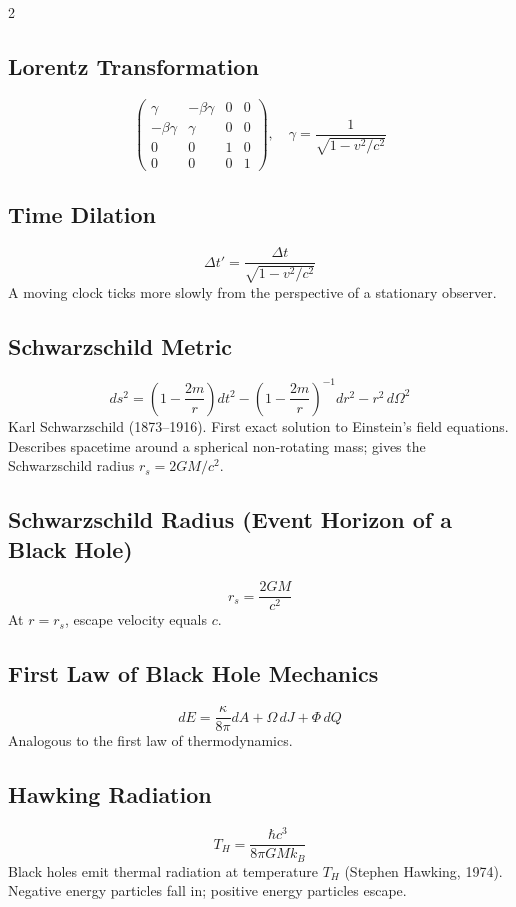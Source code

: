 \documentclass[10pt,a4paper]{article}
\begin{document}
\begin{multicols}{2}
\subsection{Lorentz Transformation}
\[
\begin{pmatrix}\gamma & -\beta\gamma & 0 & 0\\-\beta\gamma & \gamma & 0 & 0\\0 & 0 & 1 & 0\\0 & 0 & 0 & 1\end{pmatrix}, \quad \gamma = \frac{1}{\sqrt{1-v^2/c^2}}
\]

\subsection{Time Dilation}
\[
\Delta t' = \frac{\Delta t}{\sqrt{1-v^2/c^2}}
\]
A moving clock ticks more slowly from the perspective of a stationary observer.

\subsection{Schwarzschild Metric}
\[
ds^2 = \left(1-\frac{2m}{r}\right)dt^2 - \left(1-\frac{2m}{r}\right)^{-1}dr^2 - r^2\,d\Omega^2
\]
Karl Schwarzschild (1873--1916). First exact solution to Einstein's field equations. Describes spacetime around a spherical non-rotating mass; gives the Schwarzschild radius $r_s = 2GM/c^2$.

\subsection{Schwarzschild Radius (Event Horizon of a Black Hole)}
\[
r_s = \frac{2GM}{c^2}
\]
At $r = r_s$, escape velocity equals $c$.

\subsection{First Law of Black Hole Mechanics}
\[
dE = \frac{\kappa}{8\pi}dA + \Omega\,dJ + \Phi\,dQ
\]
Analogous to the first law of thermodynamics.

\subsection{Hawking Radiation}
\[
T_H = \frac{\hbar c^3}{8\pi G M k_B}
\]
Black holes emit thermal radiation at temperature $T_H$ (Stephen Hawking, 1974). Negative energy particles fall in; positive energy particles escape.


\end{multicols}
\end{document}
